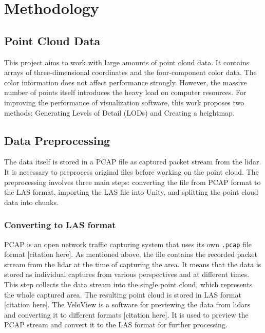 \chapter{Methodology}
\label{chap:methodology}

\section{Point Cloud Data}
\label{sec:point_cloud_data}

This project aims to work with large amounts of point cloud data. It contains arrays of three-dimensional coordinates and the four-component color data. The color information does not affect performance strongly. However, the massive number of points itself introduces the heavy load on computer resources. For improving the performance of visualization software, this work proposes two methods: Generating Levels of Detail (LODs) and Creating a heightmap.


\section{Data Preprocessing}
\label{sec:data_preprocessing}

The data itself is stored in a PCAP file as captured packet stream from the lidar. It is necessary to preprocess original files before working on the point cloud. The preprocessing involves three main steps: converting the file from PCAP format to the LAS format, importing the LAS file into Unity, and splitting the point cloud data into chunks.

\subsection{Converting to LAS format}
\label{subsec:converting_to_las}

PCAP is an open network traffic capturing system that uses its own \texttt{.pcap} file format [citation here]. As mentioned above, the file contains the recorded packet stream from the lidar at the time of capturing the area. It means that the data is stored as individual captures from various perspectives and at different times.
This step collects the data stream into the single point cloud, which represents the whole captured area. The resulting point cloud is stored in LAS format [citation here].
The VeloView is a software for previewing the data from lidars and converting it to different formats [citation here]. It is used to preview the PCAP stream and convert it to the LAS format for further processing.

